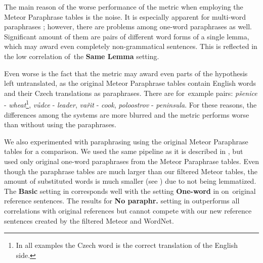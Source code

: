 The main reason of the worse performance of the metric when employing the Meteor Paraphrase tables is
the noise. It is especially apparent for multi-word paraphrases \cite{barancikova:2014}; however, there are problems among
one-word paraphrases as well. Significant amount of them are pairs of different word forms of a 
single lemma, which may award even completely non-grammatical sentences. This is reflected in the
low correlation of~the \textbf{Same Lemma} setting.

Even worse is the fact that the metric may award even parts of the hypothesis left 
untranslated, as the original Meteor Paraphrase tables contain English words and their Czech 
translations as paraphrases. There are for~example pairs: \textit{pšenice} - \textit{wheat}\footnote{In 
all examples the Czech word is the correct translation of the English side.}, \textit{vůdce} - 
\textit{leader}, \textit{vařit} -	\textit{cook}, \textit{poloostrov} - \textit{peninsula}. 
For these reasons, the differences among the systems are more blurred and the metric performs worse 
than without using the paraphrases. 

\begin{table}[bt]
\begin{center}
\caption{The \textit{frequency} column shows average number of substitution 
per sentence using the original Meteor Paraphrase tables only. The rest shows Pearson's correlation
with the silver standard using these paraphrases.} 
\label{unfiltred}
\end{center}
\end{table}

We also experimented with paraphrasing using the original Meteor Paraphrase tables for a comparison.
We used the same pipeline as it is described in , but used only original 
one-word paraphrases from the Meteor Paraphrase tables. Even though the paraphrase tables are much 
larger than our filtered Meteor tables, the amount of substituted words is much smaller (see 
) due to not being lemmatized. The \textbf{Basic} setting in  
corresponds well with the setting \textbf{One-word} in  on~original 
reference sentences. The results for \textbf{No paraphr.} setting in  outperforms 
all correlations with original references but cannot compete with our new reference sentences created 
by the filtered Meteor and WordNet.


